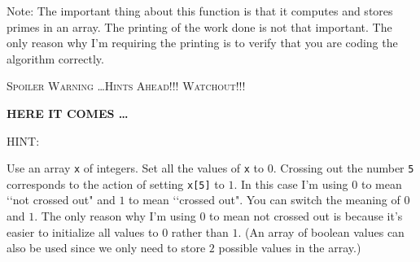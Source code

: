 Note: The important thing about this function is that it computes and
stores primes in an array. The printing of the work done is not that
important. The only reason why I'm requiring the printing is to verify
that you are coding the algorithm correctly.

\newpage

\textsc{Spoiler Warning \dots Hints Ahead!!! Watchout!!!}

\textbf{HERE IT COMES \dots}

HINT:
 
Use an array \verb!x! of integers. Set all the values of \verb!x! to $0$.
Crossing out the number \verb!5! corresponds to the action of setting
\verb!x[5]! to $1$. In this case I'm using $0$ to mean
\lq\lq not crossed out" and $1$ to mean \lq\lq crossed out". You can switch
the meaning of $0$ and $1$. The only reason why I'm using $0$ to mean not
crossed out is because it's easier to initialize all values to $0$ rather
than $1$. (An array of boolean values can also be used since we only need to
store $2$ possible values in the array.)
